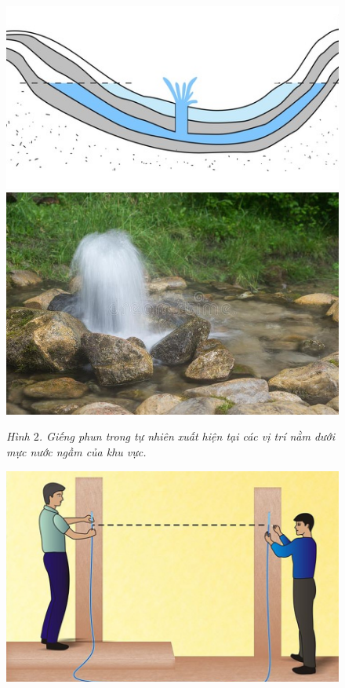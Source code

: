 \begin{multicols}{2}
	\begin{figure}[H]
		\vspace*{-5pt}
		\centering
		\captionsetup{labelformat= empty, justification=centering}
		\includegraphics[width= 1\linewidth]{2}
		\includegraphics[width= 1\linewidth]{3}
		\caption{\small\textit{\color{timhieukhoahoc}Hình $2$. Giếng phun trong tự nhiên xuất hiện tại các vị trí nằm dưới mực nước ngầm của khu vực.}}
		\vspace*{-5pt}
	\end{figure}
	\begin{figure}[H]
		\vspace*{5pt}
		\centering
		\captionsetup{labelformat= empty, justification=centering}
		\includegraphics[width= 1\linewidth]{4}

\end{figure}
\end{multicols}

